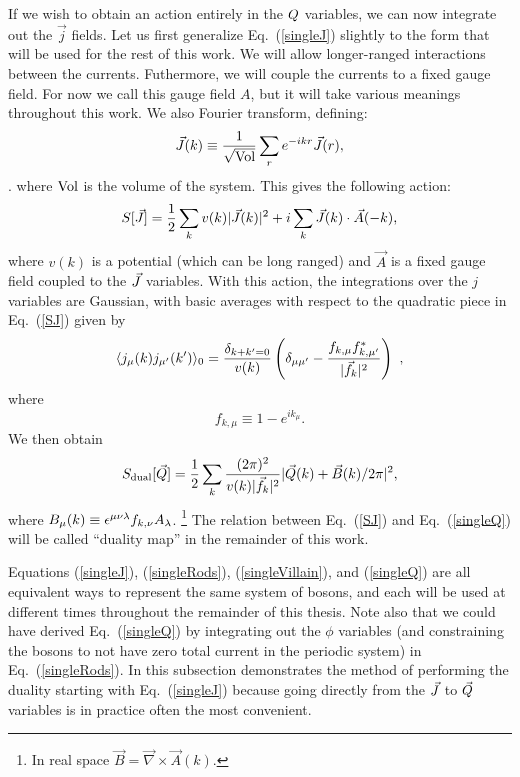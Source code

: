 If we wish to obtain an action entirely in the $Q$ variables, we can now integrate out the $\vec{j}$ fields. Let us first generalize Eq.~(\ref{singleJ}) slightly to the form that will be used for the rest of this work. We will allow longer-ranged interactions between the currents. Futhermore, we will couple the currents to a fixed gauge field. For now we call this gauge field $A$, but it will take various meanings throughout this work. We also Fourier transform, defining:
\begin{equation}
\vec{J}(k)\equiv \frac{1}{\sqrt{\rm Vol}} \sum_r e^{-ikr} \vec{J}(r),
\label{fourier_def}
\end{equation}. 
where ${\rm Vol}$ is the volume of the system. This gives the following action:
\begin{eqnarray}
S[\vec{J}]=\frac{1}{2}\sum_{k} v(k) |\vec{J}(k)|^2 + i\sum_k  \vec{J}(k)\cdot \vec{A}(-k),
\label{SJ}
\end{eqnarray}
where $v(k)$ is a potential (which can be long ranged) and $\vec{A}$ is a fixed gauge field coupled to the $\vec{J}$ variables. 
With this action, the integrations over the $j$ variables are Gaussian, with basic averages with respect to the quadratic piece in Eq.~(\ref{SJ}) given by
\begin{equation}
\langle j_\mu(k) j_{\mu'}(k') \rangle_0 = \frac{\delta_{k+k'=0}}{v(k)} \left(\delta_{\mu \mu'} - \frac{f_{k,\mu} f_{k,\mu'}^*}{|\vec{f}_k|^2} \right) ~,
\end{equation}
 where 
 \begin{equation}
 f_{k,\mu} \equiv 1 - e^{i k_\mu}.
 \end{equation}
  We then obtain
\begin{equation}
S_{\rm dual}[\vec{Q}] = \frac{1}{2} \sum_k \frac{(2\pi)^2}{v(k) |\vec{f}_k|^2} |\vec{Q}(k) + \vec{B}(k)/2\pi|^2,
\label{singleQ}
\end{equation}
where $B_\mu(k) \equiv \epsilon^{\mu\nu\lambda} f_{k,\nu} A_\lambda$.
\footnote{In real space $\vec{B}=\vec{\nabla}\times \vec{A}(k)$.}
  The relation between Eq.~(\ref{SJ}) and Eq.~(\ref{singleQ}) will be called ``duality map'' in the remainder of this work. 

Equations (\ref{singleJ}), (\ref{singleRods}), (\ref{singleVillain}), and (\ref{singleQ}) are all equivalent ways to represent the same system of bosons, and each will be used at different times throughout the remainder of this thesis. Note also that we could have derived Eq.~(\ref{singleQ}) by integrating out the $\phi$ variables (and constraining the bosons to not have zero total current in the periodic system) in Eq.~(\ref{singleRods}). 
In this subsection demonstrates the method of performing the duality starting with Eq.~(\ref{singleJ}) because going directly from the $\vec{J}$ to $\vec{Q}$ variables is in practice often the most convenient.

